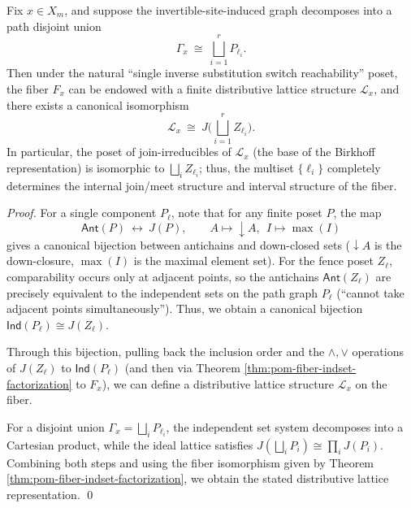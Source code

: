 \begin{theorem}\label{thm:pom-fiber-birkhoff-fence-ideal-lattice}
Fix \(x\in X_m\), and suppose the invertible-site-induced graph decomposes into a path disjoint union
\[
\Gamma_x\ \cong\ \bigsqcup_{i=1}^r P_{\ell_i}.
\]
Then under the natural ``single inverse substitution switch reachability'' poset, the fiber \(F_x\) can be endowed with a finite distributive lattice structure \(\mathcal L_x\), and there exists a canonical isomorphism
\[
\mathcal L_x\ \cong\ J\!\Big(\bigsqcup_{i=1}^r Z_{\ell_i}\Big).
\]
In particular, the poset of join-irreducibles of \(\mathcal L_x\) (the base of the Birkhoff representation) is isomorphic to
\(\bigsqcup_i Z_{\ell_i}\); thus, the multiset \(\{\ell_i\}\) completely determines the internal join/meet structure and interval structure of the fiber.
\end{theorem}
\begin{proof}
For a single component \(P_\ell\), note that for any finite poset \(P\), the map
\[
\mathsf{Ant}(P)\ \longleftrightarrow\ J(P),
\qquad
A\mapsto \downarrow A,\ \ I\mapsto \max(I)
\]
gives a canonical bijection between antichains and down-closed sets (\(\downarrow A\) is the down-closure, \(\max(I)\) is the maximal element set).
For the fence poset \(Z_\ell\), comparability occurs only at adjacent points,
so the antichains \(\mathsf{Ant}(Z_\ell)\) are precisely equivalent to the independent sets on the path graph \(P_\ell\) (``cannot take adjacent points simultaneously'').
Thus, we obtain a canonical bijection \(\mathsf{Ind}(P_\ell)\cong J(Z_\ell)\).
\par
Through this bijection, pulling back the inclusion order and the \(\wedge,\vee\) operations of \(J(Z_\ell)\) to \(\mathsf{Ind}(P_\ell)\) (and then via Theorem \ref{thm:pom-fiber-indset-factorization} to \(F_x\)),
we can define a distributive lattice structure \(\mathcal L_x\) on the fiber.
\par
For a disjoint union \(\Gamma_x=\bigsqcup_i P_{\ell_i}\), the independent set system decomposes into a Cartesian product,
while the ideal lattice satisfies \(J(\bigsqcup_i P_i)\cong\prod_i J(P_i)\).
Combining both steps and using the fiber isomorphism given by Theorem \ref{thm:pom-fiber-indset-factorization}, we obtain the stated distributive lattice representation. \qed
\end{proof}

